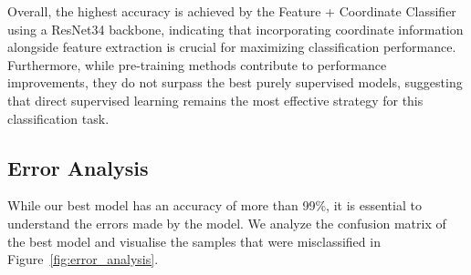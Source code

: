 \documentclass{article}
\begin{document}
Overall, the highest accuracy is achieved by the Feature + Coordinate
Classifier using a ResNet34 backbone, indicating that incorporating coordinate
information alongside feature extraction is crucial for maximizing
classification performance. Furthermore, while pre-training methods contribute
to performance improvements, they do not surpass the best purely supervised
models, suggesting that direct supervised learning remains the most effective
strategy for this classification task.

\subsection{Error Analysis}

While our best model has an accuracy of more than 99\%, it is essential to
understand the errors made by the model. We analyze the confusion matrix of the
best model and visualise the samples that were misclassified in
Figure~\ref{fig:error_analysis}.
\end{document}
